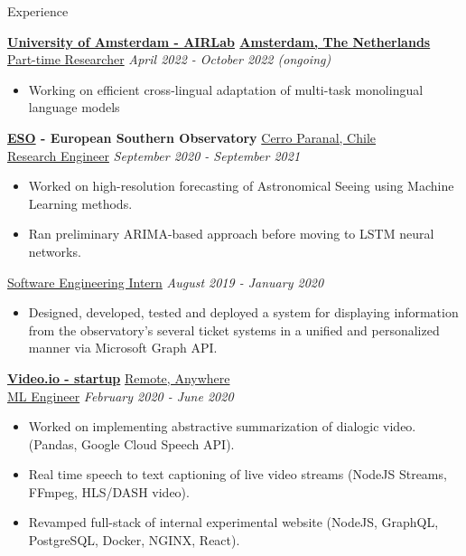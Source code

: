 \documentclass{resume} %
\begin{document}
\begin{rSection}{Experience}

	{\bf \href{https://icai.ai/airlab/}{University of Amsterdam - AIRLab} \hfill \underline{Amsterdam,
			The Netherlands}}
	\\ \underline{Part-time Researcher} \hfill {\em April 2022 - October 2022 (ongoing)}
	\begin{itemize}\vspace{-0.5em}
		\item Working on efficient cross-lingual adaptation of multi-task monolingual language models
	\end{itemize}

	{\bf \href{https://www.eso.org}{ESO} - European Southern Observatory} \hfill \underline{Cerro Paranal, Chile}
	\\ \underline{Research Engineer} \hfill {\em September 2020 - September 2021}
	\begin{itemize}\vspace{-0.5em}
		\item Worked on high-resolution forecasting of Astronomical Seeing using Machine Learning
		      methods.
		\item Ran preliminary ARIMA-based approach before moving to LSTM neural networks.
	\end{itemize}
	\underline{Software Engineering Intern} \hfill {\em August 2019 - January 2020}
	\begin{itemize}\vspace{-0.5em}
		\item Designed, developed, tested and deployed a system for displaying information from the
		      observatory's several ticket systems in a unified and personalized manner via Microsoft Graph
		      API.
	\end{itemize}

	{\bf \href{https://video.io/}{Video.io - startup}} \hfill \underline{Remote, Anywhere}
	\\ \underline{ML Engineer} \hfill {\em February 2020 - June 2020}
	\begin{itemize}\vspace{-0.5em}
		\item Worked on implementing abstractive summarization of dialogic video. (Pandas, Google Cloud
		      Speech API).
		\item Real time speech to text captioning of live video streams (NodeJS Streams, FFmpeg,
		      HLS/DASH video).
		\item Revamped full-stack of internal experimental website (NodeJS, GraphQL, PostgreSQL, Docker,
		      NGINX, React).
	\end{itemize}


\end{rSection}
\end{document}
